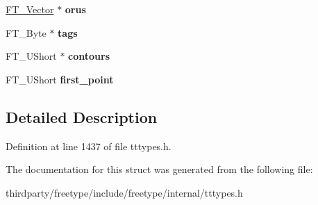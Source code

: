 \begin{DoxyCompactItemize}
\hyperlink{struct_f_t___vector__}{F\+T\+\_\+\+Vector} $\ast$ {\bfseries orus}
\item 
\mbox{\label{struct_t_t___glyph_zone_rec___ae816c5c1096e333741d3f3f9d3ae0a8f}} 
F\+T\+\_\+\+Byte $\ast$ {\bfseries tags}
\item 
\mbox{\label{struct_t_t___glyph_zone_rec___ad16498cac0d4d233dce009eb74d63de1}} 
F\+T\+\_\+\+U\+Short $\ast$ {\bfseries contours}
\item 
\mbox{\label{struct_t_t___glyph_zone_rec___a9d655be80b3e31652f69ede54458faaf}} 
F\+T\+\_\+\+U\+Short {\bfseries first\+\_\+point}
\end{DoxyCompactItemize}


\subsection{Detailed Description}


Definition at line 1437 of file tttypes.\+h.



The documentation for this struct was generated from the following file\+:\begin{DoxyCompactItemize}
\item 
thirdparty/freetype/include/freetype/internal/tttypes.\+h\end{DoxyCompactItemize}
